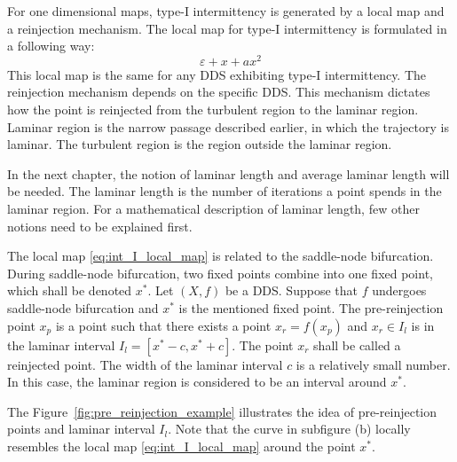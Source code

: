 For one dimensional maps, type-I intermittency is generated by a local map and a reinjection mechanism.
The local map for type-I intermittency is formulated in a following way:
\begin{equation}
\varepsilon + x + a x^2 \label{eq:int_I_local_map}
\end{equation}
This local map is the same for any DDS exhibiting type-I intermittency.
The reinjection mechanism depends on the specific DDS.
This mechanism dictates how the point is reinjected from the turbulent region to the laminar region.
Laminar region is the narrow passage described earlier, in which the trajectory is laminar.
The turbulent region is the region outside the laminar region.
\par
In the next chapter, the notion of laminar length and average laminar length will be needed.
The laminar length is the number of iterations a point spends in the laminar region.
For a mathematical description of laminar length, few other notions need to be explained first.
\par
The local map \eqref{eq:int_I_local_map} is related to the saddle-node bifurcation.
During saddle-node bifurcation, two fixed points combine into one fixed point, which shall be denoted $x^{*}$.
Let $(X, f)$ be a DDS. Suppose that $f$ undergoes saddle-node bifurcation and $x^{*}$ is the mentioned fixed point.
The pre-reinjection point $x_p$ is a point such that there exists a point $x_r = f(x_p)$ and $x_r \in I_l$ is in the laminar interval $I_l = [ x^{*}-c, x^{*}+c ]$.
The point $x_r$ shall be called a reinjected point.
The width of the laminar interval $c$ is a relatively small number.
In this case, the laminar region is considered to be an interval around $x^{*}$.
\par
The Figure~\ref{fig:pre_reinjection_example} illustrates the idea of pre-reinjection points and laminar interval $I_l$.
Note that the curve in subfigure (b) locally resembles the local map \eqref{eq:int_I_local_map} around the point $x^{*}$.
